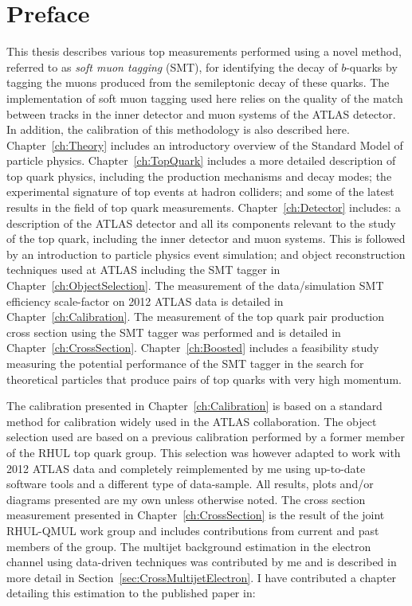 \thispagestyle{empty}
\vspace{1cm}
\chapter*{Preface}
This thesis describes various top measurements performed using a novel method, referred to as \emph{soft muon tagging} (SMT), for identifying the decay of $b$-quarks by tagging the muons produced from the semileptonic decay of these quarks. The implementation of soft muon tagging used here relies on the quality of the match between tracks in the inner detector and muon systems of the ATLAS detector. In addition, the calibration of this methodology is also described here.
Chapter~\ref{ch:Theory} includes an introductory overview of the Standard Model of particle physics. Chapter~\ref{ch:TopQuark} includes a more detailed description of top quark physics, including the production mechanisms and decay modes; the experimental signature of top events at hadron colliders; and some of the latest results in the field of top quark measurements. Chapter~\ref{ch:Detector} includes: a description of the ATLAS detector and all its components relevant to the study of the top quark, including the inner detector and muon systems. This is followed by an introduction to particle physics event simulation; and object reconstruction techniques used at ATLAS including the SMT tagger in Chapter~\ref{ch:ObjectSelection}. The measurement of the data/simulation SMT efficiency scale-factor on 2012 ATLAS data is detailed in Chapter~\ref{ch:Calibration}. The measurement of the top quark pair production cross section using the SMT tagger was performed and is detailed in Chapter~\ref{ch:CrossSection}. Chapter~\ref{ch:Boosted} includes a feasibility study measuring the potential performance of the SMT tagger in the search for theoretical particles that produce pairs of top quarks with very high momentum.

The calibration presented in Chapter~\ref{ch:Calibration} is based on a standard method for calibration widely used in the ATLAS collaboration. The object selection used are based on a previous calibration performed by a former member of the RHUL top quark group. This selection was however adapted to work with 2012 ATLAS data and completely reimplemented by me using up-to-date software tools and a different type of data-sample. All results, plots and/or diagrams presented are my own unless otherwise noted. The cross section measurement presented in Chapter~\ref{ch:CrossSection} is the result of the joint RHUL-QMUL work group and includes contributions from current and past members of the group. The multijet background estimation in the electron channel using data-driven techniques was contributed by me and is described in more detail in Section~\ref{sec:CrossMultijetElectron}. I have contributed a chapter detailing this estimation to the published paper in:

